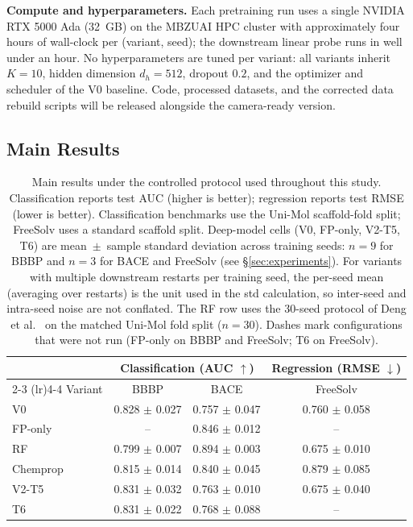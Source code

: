 \documentclass[conference]{IEEEtran}
\begin{document}
\noindent\textbf{Compute and hyperparameters.} Each pretraining run uses a single NVIDIA RTX 5000 Ada (32~GB) on the MBZUAI HPC cluster with approximately four hours of wall-clock per (variant, seed); the downstream linear probe runs in well under an hour. No hyperparameters are tuned per variant: all variants inherit $K{=}10$, hidden dimension $d_h{=}512$, dropout $0.2$, and the optimizer and scheduler of the V0 baseline. Code, processed datasets, and the corrected data rebuild scripts will be released alongside the camera-ready version.

\subsection{Main Results}

\begin{table}[t]
\caption{Main results under the controlled protocol used throughout this study. Classification reports test AUC (higher is better); regression reports test RMSE (lower is better). Classification benchmarks use the Uni-Mol scaffold-fold split; FreeSolv uses a standard scaffold split. Deep-model cells (V0, FP-only, V2-T5, T6) are mean~$\pm$~sample standard deviation across training seeds: $n{=}9$ for BBBP and $n{=}3$ for BACE and FreeSolv (see \S\ref{sec:experiments}). For variants with multiple downstream restarts per training seed, the per-seed mean (averaging over restarts) is the unit used in the std calculation, so inter-seed and intra-seed noise are not conflated. The RF row uses the 30-seed protocol of Deng et al.~\cite{deng2023systematic} on the matched Uni-Mol fold split ($n{=}30$). Dashes mark configurations that were not run (FP-only on BBBP and FreeSolv; T6 on FreeSolv).}
\label{tab:main}
\centering
\begin{tabular}{lccc}
\toprule
 & \multicolumn{2}{c}{Classification (AUC $\uparrow$)} & Regression (RMSE $\downarrow$) \\
\cmidrule(lr){2-3} \cmidrule(lr){4-4}
Variant & BBBP & BACE & FreeSolv \\
\midrule
V0 & 0.828 $\pm$ 0.027 & 0.757 $\pm$ 0.047 & 0.760 $\pm$ 0.058 \\
FP-only & -- & 0.846 $\pm$ 0.012 & -- \\
RF & 0.799 $\pm$ 0.007 & 0.894 $\pm$ 0.003 & 0.675 $\pm$ 0.010 \\
Chemprop & 0.815 $\pm$ 0.014 & 0.840 $\pm$ 0.045 & 0.879 $\pm$ 0.085 \\
V2-T5 & 0.831 $\pm$ 0.032 & 0.763 $\pm$ 0.010 & 0.675 $\pm$ 0.040 \\
T6 & 0.831 $\pm$ 0.022 & 0.768 $\pm$ 0.088 & -- \\
\bottomrule
\end{tabular}
\end{table}
\end{document}
